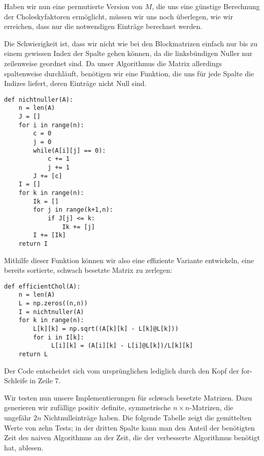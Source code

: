 \documentclass{article}
\begin{document}
Haben wir nun eine permutierte Version von $M$, die uns eine günstige Berechnung der Choleskyfaktoren ermöglicht, müssen wir uns noch überlegen, wie wir erreichen, dass nur die notwendigen Einträge berechnet werden.

Die Schwierigkeit ist, dass wir nicht wie bei den Blockmatrizen einfach nur bis zu einem gewissen Index der Spalte gehen können, da die linksbündigen Nuller nur zeilenweise geordnet sind. Da unser Algorithmus die Matrix allerdings spaltenweise durchläuft, benötigen wir eine Funktion, die uns für jede Spalte die Indizes liefert, deren Einträge nicht Null sind.

\lstset{language=Python}
\lstset{frame=lines}
\lstset{basicstyle=\footnotesize}
\begin{lstlisting}
def nichtnuller(A):
    n = len(A)
    J = []
    for i in range(n):
        c = 0
        j = 0
        while(A[i][j] == 0):
            c += 1
            j += 1
        J += [c]
    I = []
    for k in range(n):
        Ik = []
        for j in range(k+1,n):
            if J[j] <= k:
                Ik += [j]
        I += [Ik]
    return I
\end{lstlisting}


Mithilfe dieser Funktion können wir also eine effiziente Variante entwickeln, eine bereits sortierte, schwach besetzte Matrix zu zerlegen:

\lstset{language=Python}
\lstset{frame=lines}
\lstset{basicstyle=\footnotesize}
\begin{lstlisting}
def efficientChol(A):
    n = len(A)
    L = np.zeros((n,n))
    I = nichtnuller(A)
    for k in range(n):
        L[k][k] = np.sqrt((A[k][k] - L[k]@L[k]))
        for i in I[k]:
             L[i][k] = (A[i][k] - L[i]@L[k])/L[k][k]
    return L
\end{lstlisting}
Der Code entscheidet sich vom ursprünglichen lediglich durch den Kopf der for-Schleife in Zeile 7.


Wir testen nun unsere Implementierungen für schwach besetzte Matrizen. Dazu generieren wir zufällige positiv definite, symmetrische $n\times n$-Matrizen, die ungefähr $2n$ Nichtnulleinträge haben. Die folgende Tabelle zeigt die gemittelten Werte von zehn Tests; in der dritten Spalte kann man den Anteil der benötigten Zeit des naiven Algorithmus an der Zeit, die der verbesserte Algorithmus benötigt hat, ablesen.
\end{document}
